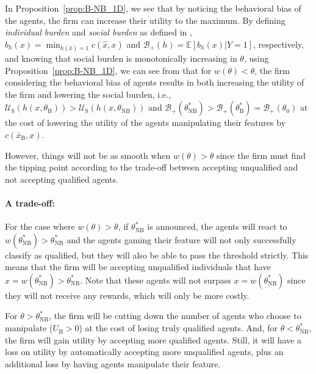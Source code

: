 In Proposition~\ref{prop:B-NB_1D}, we see that by noticing the behavioral bias of the agents, the firm can increase their utility to the maximum. By defining \emph{individual burden} and \emph{social burden} as defined in \cite{Milli2019socialcost}, $b_h(x) = \min_{h(\hat x) = 1}c(\hat x, x)$ and $\mathcal{B}_{+}(h) = \mathbb{E}[b_h(x)|Y=1]$, respectively, and knowing that social burden is monotonically increasing in $\theta$, using Proposition~\ref{prop:B-NB_1D}, we can see from that for $w(\theta)<\theta$, the firm considering the behavioral bias of agents results in both increasing the utility of the firm and lowering the social burden, i.e., $\mathcal{U}
_\text{S}(h(x, \theta_{\text{B}})) > \mathcal{U}
_\text{S}(h(x, \theta_{\text{NB}}))$ and $\mathcal{B}
_{+}(\theta^*_\text{NB}) > \mathcal{B}
_{+}(\theta^*_\text{B}) = \mathcal{B}
_{+}(\theta_0)$ at the cost of lowering the utility of the agents manipulating their features by $c(\bar x_\text{B}, x)$. 

However, things will not be as smooth when $w(\theta)>\theta$ since the firm must find the tipping point according to the trade-off between accepting unqualified and not accepting qualified agents. 

\paragraph{A trade-off:} For the case where $w(\theta) > \theta$, if $\theta^*_\text{NB}$ is announced, the agents will react to $w(\theta^*_\text{NB}) 
> \theta^*_\text{NB}$ and the agents gaming their feature will not only successfully classify as qualified, but they will also be able to pass the threshold strictly. This means that the firm will be accepting unqualified individuals that have $x= w(\theta^*_\text{NB}) >\theta^*_\text{NB}$. Note that these agents will not surpass $x= w(\theta^*_\text{NB})$ since they will not receive any rewards, which will only be more costly. 

For $\theta > \theta^*_\text{NB}$, the firm will be cutting down the number of agents who choose to manipulate ($U_\text{B}>0$) at the cost of losing truly qualified agents. And, for $\theta < \theta^*_\text{NB}$, the firm will gain utility by accepting more qualified agents. Still, it will have a loss on utility by automatically accepting more unqualified agents, plus an additional loss by having agents manipulate their feature. 

